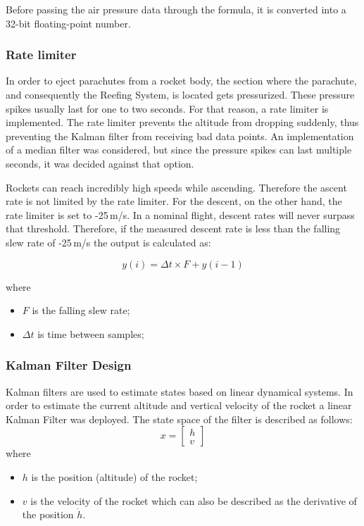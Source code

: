 Before passing the air pressure data through the formula, it is converted into a 32-bit floating-point number.

\subsubsection{Rate limiter}
In order to eject parachutes from a rocket body, the section where the parachute, and consequently the Reefing System, is located gets pressurized. These pressure spikes usually last for one to two seconds. For that reason, a rate limiter is implemented. The rate limiter prevents the altitude from dropping suddenly, thus preventing the Kalman filter from receiving bad data points. An implementation of a median filter was considered, but since the pressure spikes can last multiple seconds, it was decided against that option. 

Rockets can reach incredibly high speeds while ascending. Therefore the ascent rate is not limited by the rate limiter. For the descent, on the other hand, the rate limiter is set to -25\,m/s. In a nominal flight, descent rates will never surpass that threshold. Therefore, if the measured descent rate is less than the falling slew rate of -25\,m/s the output is calculated as:

\begin{equation}
    y(i) = \Delta t \times F + y(i-1) 
\end{equation}

where

\begin{itemize}
    \item $F$ is the falling slew rate;
    \item $\Delta t$ is time between samples;
\end{itemize}

\newpage

\subsubsection{Kalman Filter Design}

Kalman filters are used to estimate states based on linear dynamical systems. In order to estimate the current altitude and vertical velocity of the rocket a linear Kalman Filter was deployed. The state space of the filter is described as follows:
\begin{equation}
    x = \begin{bmatrix}h\\v\end{bmatrix}
\end{equation}
where
\begin{itemize}
    \item $h$ is the position (altitude) of the rocket;
    \item $v$ is the velocity of the rocket which can also be described as the derivative of the position $\dot{h}$.
\end{itemize}

